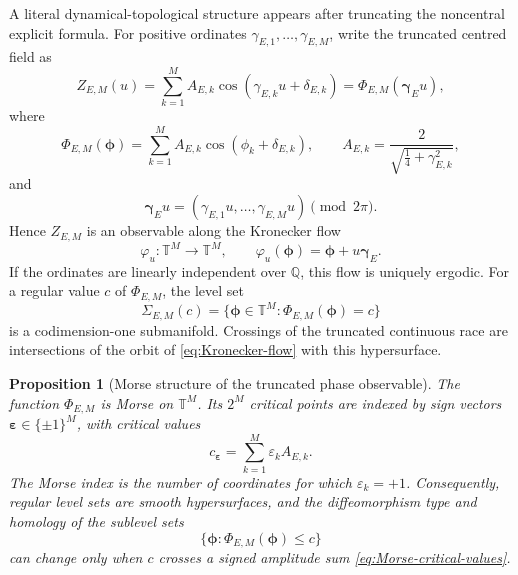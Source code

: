\documentclass[11pt,reqno]{amsart}
\newtheorem{proposition}{Proposition}
\theoremstyle{remark}
\newcommand{\Q}{\mathbb{Q}}
\newcommand{\T}{\mathbb{T}}
\begin{document}
A literal dynamical-topological structure appears after truncating the noncentral explicit formula.  For positive ordinates $\gamma_{E,1},\ldots,\gamma_{E,M}$, write the truncated centred field as
\begin{equation}
  Z_{E,M}(u)
  =\sum_{k=1}^{M}A_{E,k}
   \cos(\gamma_{E,k}u+\delta_{E,k})
  =\Phi_{E,M}(\boldsymbol\gamma_Eu),
  \label{eq:truncated-phase-field}
\end{equation}
where
\begin{equation}
  \Phi_{E,M}(\boldsymbol\phi)
  =\sum_{k=1}^{M}A_{E,k}\cos(\phi_k+\delta_{E,k}),
  \qquad
  A_{E,k}=\frac{2}{\sqrt{\tfrac14+\gamma_{E,k}^2}},
\end{equation}
and
\begin{equation}
  \boldsymbol\gamma_Eu
  =(\gamma_{E,1}u,\ldots,\gamma_{E,M}u)\pmod{2\pi}.
\end{equation}
Hence $Z_{E,M}$ is an observable along the Kronecker flow
\begin{equation}
  \varphi_u:\T^M\longrightarrow\T^M,
  \qquad
  \varphi_u(\boldsymbol\phi)
  =\boldsymbol\phi+u\boldsymbol\gamma_E.
  \label{eq:Kronecker-flow}
\end{equation}
If the ordinates are linearly independent over $\Q$, this flow is uniquely ergodic.  For a regular value $c$ of $\Phi_{E,M}$, the level set
\begin{equation}
  \Sigma_{E,M}(c)
  =\{\boldsymbol\phi\in\T^M:
  \Phi_{E,M}(\boldsymbol\phi)=c\}
  \label{eq:crossing-hypersurface}
\end{equation}
is a codimension-one submanifold.  Crossings of the truncated continuous race are intersections of the orbit of \eqref{eq:Kronecker-flow} with this hypersurface.

\begin{proposition}[Morse structure of the truncated phase observable]
\label{prop:phase-morse}
The function $\Phi_{E,M}$ is Morse on $\T^M$.  Its $2^M$ critical points are indexed by sign vectors $\boldsymbol\varepsilon\in\{\pm1\}^M$, with critical values
\begin{equation}
  c_{\boldsymbol\varepsilon}
  =\sum_{k=1}^{M}\varepsilon_kA_{E,k}.
  \label{eq:Morse-critical-values}
\end{equation}
The Morse index is the number of coordinates for which $\varepsilon_k=+1$.  Consequently, regular level sets are smooth hypersurfaces, and the diffeomorphism type and homology of the sublevel sets
\begin{equation}
  \{\boldsymbol\phi:\Phi_{E,M}(\boldsymbol\phi)\le c\}
\end{equation}
can change only when $c$ crosses a signed amplitude sum \eqref{eq:Morse-critical-values}.
\end{proposition}
\end{document}
